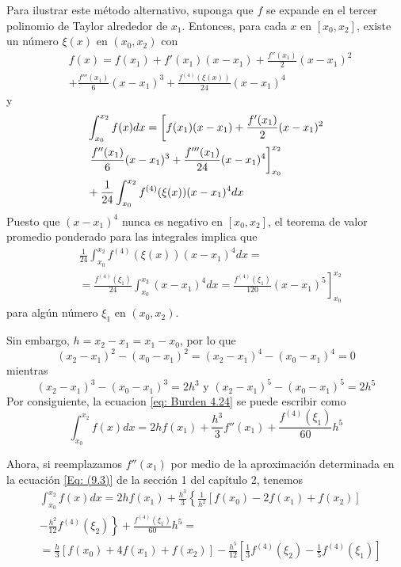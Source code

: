 Para ilustrar este método alternativo, suponga que $f$ se expande en el tercer polinomio de Taylor alrededor de $x_1$. Entonces, para cada $x$ en $[x_0, x_2]$, existe un número $\xi(x)$ en $(x_0, x_2)$ con
\begin{align*}
    & f(x) = f(x_1) + f'(x_1) (x - x_1) + \frac{f''(x_1)}{2} (x - x_1)^2 \\
    & + \frac{f'''(x_1)}{6} (x - x_1)^3 + \frac{f^{(4)} (\xi(x))}{24} (x - x_1)^4
\end{align*}
y
\begin{align}
    \label{eq: Burden 4.24}
    & \int_{x_0}^{x_2} f(x) dx = \left[ f(x_1) (x - x_1) + \frac{f'(x_1)}{2} (x - x_1)^2 \right. \notag \\
    & \left. \frac{f''(x_1)}{6} (x - x_1)^3 + \frac{f'''(x_1)}{24} (x - x_1)^4 \right]_{x_0}^{x_2} \\
    & + \frac{1}{24} \int_{x_0}^{x_2} f^{(4)}(\xi(x)) (x - x_1)^4 dx \notag
\end{align}
Puesto que $(x - x_1)^4$ nunca es negativo en $[x_0, x_2]$, el teorema de valor promedio ponderado para las integrales implica que 
\begin{align*}
    & \frac{1}{24} \int_{x_0}^{x_2} f^{(4)} (\xi(x)) (x - x_1)^4 dx = \\
    & = \frac{f^{(4)}(\xi_1)}{24} \int_{x_0}^{x_2} (x - x_1)^4 dx = \left. \frac{f^{(4)}(\xi_1)}{120}(x - x_1)^5 \right]_{x_0}^{x_2}
\end{align*}
para algún número $\xi_1$ en $(x_0 , x_2)$.

Sin embargo, $h = x_2 - x_1 = x_1 - x_0$, por lo que 
\[ (x_2 - x_1)^2 - (x_0 - x_1)^2 = (x_2 - x_1)^4 - (x_0 - x_1)^4 = 0 \]
mientras
\[ (x_2 - x_1)^3 - (x_0 - x_1)^3 = 2h^3 \text{ y } (x_2 - x_1)^5 - (x_0 - x_1)^5 = 2h^5\]
Por consiguiente, la ecuacion \ref{eq: Burden 4.24} se puede escribir como 
\[ \int_{x_0}^{x_2} f(x) dx = 2h f(x_1) + \frac{h^3}{3} f''(x_1) + \frac{f^{(4)}(\xi_1)}{60} h^5 \]

Ahora, si reemplazamos $f''(x_1)$ por medio de la aproximación determinada en la ecuación \ref{Eq: (9.3)} de la sección 1 del capítulo 2, tenemos
\begin{align*}
    & \int_{x_0}^{x_2} f(x) dx = 2 h f(x_1) + \frac{h^3}{3} \left\{ \frac{1}{h^2} [f(x_0) - 2 f(x_1) + f(x_2)] \right. \\
    & \left. - \frac{h^2}{12} f^{(4)} (\xi_2) \right\} + \frac{f^{(4)}(\xi_1)}{60} h^5 = \\
    & = \frac{h}{3} [f(x_0) + 4f(x_1) + f(x_2)] - \frac{h^5}{12} \left[ \frac{1}{3} f^{(4)}(\xi_2) - \frac{1}{5} f^{(4)}(\xi_1) \right]
\end{align*}

